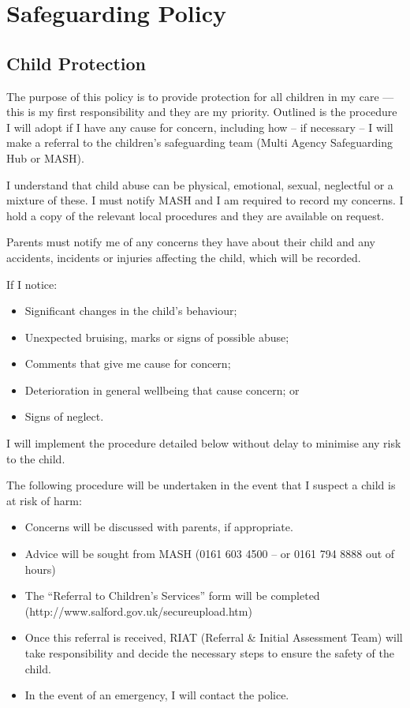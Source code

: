 

\section{Safeguarding Policy}

\subsection{Child Protection}

The purpose of this policy is to provide protection for all children in
my care --- this is my first responsibility and they are my priority.
Outlined is the procedure I will adopt if I have any cause for concern,
including how -- if necessary -- I will make a referral to the
children's safeguarding team (Multi Agency Safeguarding Hub or MASH).

I understand that child abuse can be physical, emotional, sexual,
neglectful or a mixture of these. I must notify MASH and I am required
to record my concerns. I hold a copy of the relevant local procedures
and they are available on request.

Parents must notify me of any concerns they have about their child and
any accidents, incidents or injuries affecting the child, which will be
recorded.

If I notice:
\begin{itemize}
\item
  Significant changes in the child's behaviour;
\item
  Unexpected bruising, marks or signs of possible abuse;
\item
  Comments that give me cause for concern;
\item
  Deterioration in general wellbeing that cause concern; or
\item
  Signs of neglect.
\end{itemize}

I will implement the procedure detailed below without delay to minimise
any risk to the child.

The following procedure will be undertaken in the event that I suspect a
child is at risk of harm:

\begin{itemize}
\item
  Concerns will be discussed with parents, if appropriate.
\item
  Advice will be sought from MASH (0161 603 4500 -- or 0161 794 8888
  out of hours)
\item
  The ``Referral to Children's Services'' form will be completed
  (http://www.salford.gov.uk/secureupload.htm)
\item
  Once this referral is received, RIAT (Referral \& Initial Assessment
  Team) will take responsibility and decide the necessary steps to
  ensure the safety of the child.
\item
  In the event of an emergency, I will contact the police.
\end{itemize}

